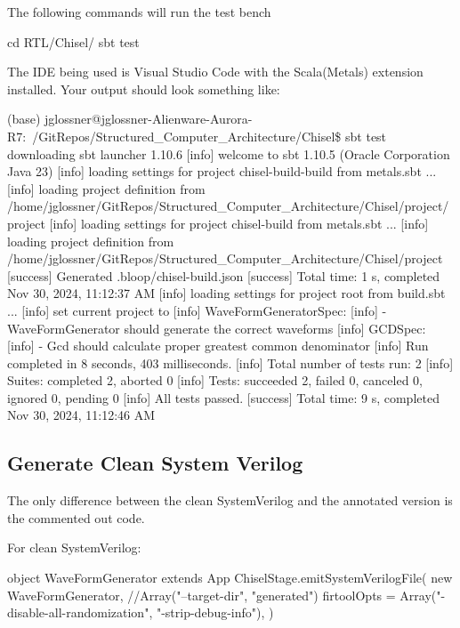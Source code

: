 The following commands will run the test bench
\begin{bashcode}
cd RTL/Chisel/
sbt test
\end{bashcode}

The IDE being used is Visual Studio Code with the Scala(Metals) extension installed. Your output should look something like:
\begin{bashcode}
(base) jglossner@jglossner-Alienware-Aurora-R7:~/GitRepos/Structured_Computer_Architecture/Chisel\$ sbt test
downloading sbt launcher 1.10.6
[info] welcome to sbt 1.10.5 (Oracle Corporation Java 23)
[info] loading settings for project chisel-build-build from metals.sbt ...
[info] loading project definition from /home/jglossner/GitRepos/Structured_Computer_Architecture/Chisel/project/project
[info] loading settings for project chisel-build from metals.sbt ...
[info] loading project definition from /home/jglossner/GitRepos/Structured_Computer_Architecture/Chisel/project
[success] Generated .bloop/chisel-build.json
[success] Total time: 1 s, completed Nov 30, 2024, 11:12:37 AM
[info] loading settings for project root from build.sbt ...
[info] set current project to %
[info] WaveFormGeneratorSpec:
[info] - WaveFormGenerator should generate the correct waveforms
[info] GCDSpec:
[info] - Gcd should calculate proper greatest common denominator
[info] Run completed in 8 seconds, 403 milliseconds.
[info] Total number of tests run: 2
[info] Suites: completed 2, aborted 0
[info] Tests: succeeded 2, failed 0, canceled 0, ignored 0, pending 0
[info] All tests passed.
[success] Total time: 9 s, completed Nov 30, 2024, 11:12:46 AM
\end{bashcode}

\subsection{Generate Clean System Verilog}
The only difference between the clean SystemVerilog and the annotated version is the commented out code.

For clean SystemVerilog:
\begin{chiselcode}
object WaveFormGenerator extends App {
  ChiselStage.emitSystemVerilogFile(
    new WaveFormGenerator,
    //Array("--target-dir", "generated")
    firtoolOpts = Array("-disable-all-randomization", "-strip-debug-info"),
  )
}
\end{chiselcode}

